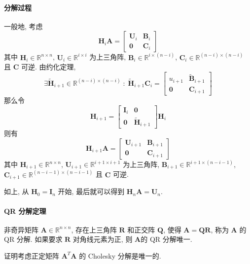 \documentclass{ctexart}
\newcommand{\Rset}{\mathbb{R}}
\begin{document}
\paragraph{分解过程}
    一般地, 考虑 \[
        \mathbf{H}_i \mathbf{A} = \begin{bmatrix}
            \mathbf{U}_i & \mathbf{B}_i \\
        \mathbf{0} & \mathbf{C}_i\end{bmatrix}\]
    其中 $\mathbf{H}_i \in \Rset^{n \times n}$, $\mathbf{U}_i \in \Rset^{i \times i}$ 为上三角阵,
        $ \mathbf{B}_i \in \Rset^{i \times (n-i)}$, $\mathbf{C}_i \in \Rset^{(n-i) \times (n-i)}$ 且 $\mathbf{C}$ 可逆.
    由约化定理, \[
        \exists \tilde{\mathbf{H}}_{i+1} \in \Rset^{(n-i)\times (n-i)}\;:\;
        \tilde{\mathbf{H}}_{i+1}\mathbf{C}_i = \begin{bmatrix} u_{i+1} & \tilde{\mathbf{B}}_{i+1} \\ \mathbf{0} & \mathbf{C}_{i+1} \end{bmatrix}\]
    那么令 \[
        \mathbf{H}_{i+1} = \begin{bmatrix}  \mathbf{I}_{i} & \mathbf{0} \\ \mathbf{0} & \tilde{\mathbf{H}}_{i+1}  \end{bmatrix} \mathbf{H}_i\]
    则有 \[
        \mathbf{H}_{i+1} \mathbf{A} = \begin{bmatrix}
            \mathbf{U}_{i+1} & \mathbf{B}_{i+1} \\
        \mathbf{0} & \mathbf{C}_{i+1}\end{bmatrix}\]
    其中 $\mathbf{H}_{i+1} \in \Rset^{n \times n}$, $\mathbf{U}_{i+1} \in \Rset^{i+1 \times i+1}$ 为上三角阵,
        $ \mathbf{B}_{i+1} \in \Rset^{i+1 \times (n-i-1)}$, $\mathbf{C}_{i+1} \in \Rset^{(n-i-1) \times (n-i-1)}$ 且 $\mathbf{C}$ 可逆.\par
    如上, 从 $ \mathbf{H}_0 = \mathbf{I}_n$ 开始, 最后就可以得到 $ \mathbf{H}_n \mathbf{A} = \mathbf{U}_n$.
\paragraph{QR 分解定理}
    非奇异矩阵 $\mathbf{A} \in \Rset^{n \times n}$,
    存在上三角阵 $\mathbf{R}$ 和正交阵 $\mathbf{Q}$, 使得 $\mathbf{A} = \mathbf{Q} \mathbf{R} $,
    称为 $\mathbf{A} $ 的 QR 分解.
    如果要求 $\mathbf{R}$ 对角线元素为正, 则 $\mathbf{A} $的 QR 分解唯一.\par
    证明考虑正定矩阵 $\mathbf{A}^T \mathbf{A} $ 的 Cholesky 分解是唯一的.
\end{document}
